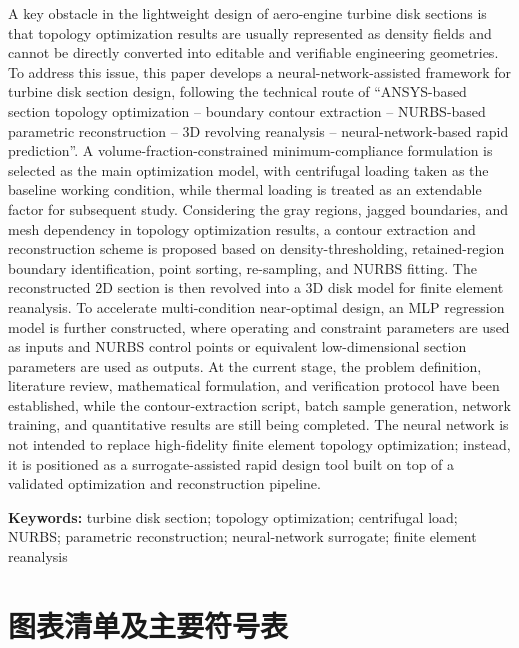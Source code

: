 \documentclass{FRB-style}
\begin{document}
A key obstacle in the lightweight design of aero-engine turbine disk sections is that topology optimization results are usually represented as density fields and cannot be directly converted into editable and verifiable engineering geometries. To address this issue, this paper develops a neural-network-assisted framework for turbine disk section design, following the technical route of “ANSYS-based section topology optimization -- boundary contour extraction -- NURBS-based parametric reconstruction -- 3D revolving reanalysis -- neural-network-based rapid prediction”. A volume-fraction-constrained minimum-compliance formulation is selected as the main optimization model, with centrifugal loading taken as the baseline working condition, while thermal loading is treated as an extendable factor for subsequent study. Considering the gray regions, jagged boundaries, and mesh dependency in topology optimization results, a contour extraction and reconstruction scheme is proposed based on density-thresholding, retained-region boundary identification, point sorting, re-sampling, and NURBS fitting. The reconstructed 2D section is then revolved into a 3D disk model for finite element reanalysis. To accelerate multi-condition near-optimal design, an MLP regression model is further constructed, where operating and constraint parameters are used as inputs and NURBS control points or equivalent low-dimensional section parameters are used as outputs. At the current stage, the problem definition, literature review, mathematical formulation, and verification protocol have been established, while the contour-extraction script, batch sample generation, network training, and quantitative results are still being completed. The neural network is not intended to replace high-fidelity finite element topology optimization; instead, it is positioned as a surrogate-assisted rapid design tool built on top of a validated optimization and reconstruction pipeline.

\noindent\textbf{Keywords:} turbine disk section; topology optimization; centrifugal load; NURBS; parametric reconstruction; neural-network surrogate; finite element reanalysis

\clearpage
\setcounter{tocdepth}{2}
\tableofcontents

\clearpage
\section*{图表清单及主要符号表}
{}
\end{document}
